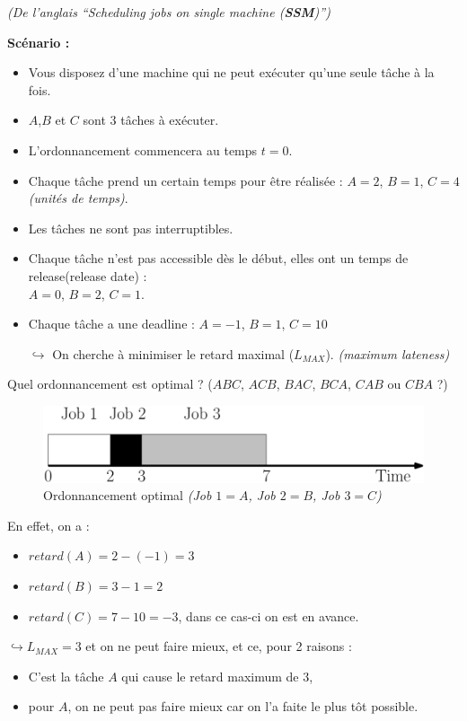 \documentclass{article}
\begin{document}
\begin{sffamily}
\begin{flushright}\textit{(De l'anglais ``Scheduling jobs on single machine (\textbf{SSM})'')}\end{flushright}
\textbf{Scénario :}
\begin{itemize}
\item Vous disposez d'une machine qui ne peut exécuter qu'une seule tâche à la fois.
\item $A$,$B$ et $C$ sont $3$ tâches à exécuter.
\item L'ordonnancement commencera au temps $t = 0$.
\item Chaque tâche prend un certain temps pour être réalisée : $A = 2$, $B = 1$, $C = 4$ \textit{(unités de temps)}.
\item Les tâches ne sont pas interruptibles.
\item Chaque tâche n'est pas accessible dès le début, elles ont un temps de release(release date) :\\ $A = 0$, $B = 2$, $C = 1$.
\item Chaque tâche a une deadline : $A = -1$, $B = 1$, $C = 10$
\item[$\hookrightarrow$] On cherche à minimiser le retard maximal ($L_{MAX}$). \textit{(maximum lateness)}
\end{itemize}

Quel ordonnancement est optimal ? ($ABC$, $ACB$, $BAC$, $BCA$, $CAB$ ou $CBA$ ?)

\begin{figure}[h!]
    \begin{center}
    \includegraphics[scale=0.2]{ordo.pdf}
    \caption{Ordonnancement optimal \textit{(Job $1 = A$, Job $2 = B$, Job $3 = C$)}}
    \end{center}
\end{figure}
\noindent En effet, on a :
\begin{itemize}
\item $retard(A) = 2 - (-1) = 3$
\item $retard(B) = 3 - 1 = 2$
\item $retard(C) = 7 - 10 = -3$, dans ce cas-ci on est en avance.
\end{itemize}

$\hookrightarrow L_{MAX} = 3$ et on ne peut faire mieux, et ce, pour 2 raisons :
\begin{itemize}
\item C'est la tâche $A$ qui cause le retard maximum de $3$,
\item pour $A$, on ne peut pas faire mieux car on l'a faite le plus tôt possible.
\end{itemize}


\end{sffamily}
\end{document}
